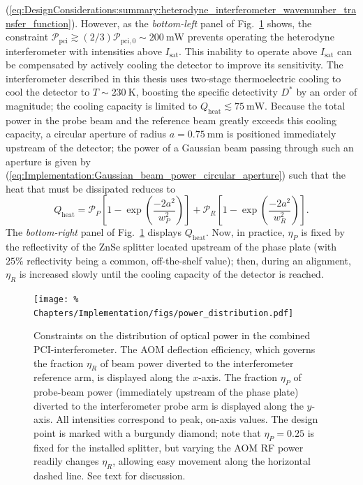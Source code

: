 (\ref{eq:DesignConsiderations:summary:heterodyne_interferometer_wavenumber_transfer_function}).
However, as the \emph{bottom-left} panel of
Fig.~\ref{fig:Implementation:power_distribution} shows,
the constraint
$\mathcal{P}_{\text{pci}}
\gtrsim
(2 / 3) \mathcal{P}_{\text{pci},0}
\sim \SI{200}{\milli\watt}$
prevents operating the heterodyne interferometer
with intensities above $I_{\text{sat}}$.
This inability to operate above $I_{\text{sat}}$ can be compensated
by actively cooling the detector to improve its sensitivity.
\graffito{\textcolor{red}{Describe elsewhere?}}
The interferometer described in this thesis
uses two-stage thermoelectric cooling
to cool the detector to $T \sim \SI{230}{\kelvin}$,
boosting the specific detectivity $D^*$ by an order of magnitude;
the cooling capacity is limited to
$Q_{\text{heat}} \lesssim \SI{75}{\milli\watt}$.
Because the total power in the probe beam and the reference beam
greatly exceeds this cooling capacity,
a circular aperture of radius $a = \SI{0.75}{\milli\meter}$
is positioned immediately upstream of the detector;
the power of a Gaussian beam passing through such an aperture is given by
(\ref{eq:Implementation:Gaussian_beam_power_circular_aperture})
such that the heat that must be dissipated reduces to
\begin{equation}
  Q_{\text{heat}}
  =
  \mathcal{P}_P
  \left[ 1 - \exp\left( \frac{-2 a^2}{w_P^2} \right) \right]
  +
  \mathcal{P}_R
  \left[ 1 - \exp\left( \frac{-2 a^2}{w_R^2} \right) \right].
\end{equation}
The \emph{bottom-right} panel of
Fig.~\ref{fig:Implementation:power_distribution}
displays $Q_{\text{heat}}$.
Now, in practice, $\eta_P$ is fixed by the reflectivity
of the ZnSe splitter located upstream of the phase plate
(with $25\%$ reflectivity being a common, off-the-shelf value);
then, during an alignment, $\eta_R$ is increased slowly
until the cooling capacity of the detector is reached.

\begin{figure}
  \centering
  \texttt{[image: \%
    Chapters/Implementation/figs/power\_distribution.pdf]}
  \caption[Constraints on the distribution of optical power]{%
    Constraints on the distribution of optical power
    in the combined PCI-interferometer.
    The AOM deflection efficiency,
    which governs the fraction $\eta_R$
    of beam power diverted to the interferometer reference arm,
    is displayed along the $x$-axis.
    The fraction $\eta_P$ of probe-beam power
    (immediately upstream of the phase plate)
    diverted to the interferometer probe arm
    is displayed along the $y$-axis.
    All intensities correspond to peak, on-axis values.
    The design point is marked with a burgundy diamond;
    note that $\eta_P = 0.25$ is fixed for the installed splitter, but
    varying the AOM RF power readily changes $\eta_R$,
    allowing easy movement along the horizontal dashed line.
    See text for discussion.
  }
\label{fig:Implementation:power_distribution}
\end{figure}


